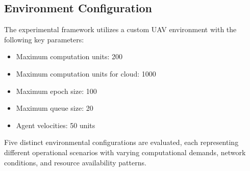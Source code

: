 \subsection{Environment Configuration}

The experimental framework utilizes a custom UAV environment with the following key parameters:
\begin{itemize}
\item Maximum computation units: 200
\item Maximum computation units for cloud: 1000
\item Maximum epoch size: 100
\item Maximum queue size: 20
\item Agent velocities: 50 units
\end{itemize}

Five distinct environmental configurations are evaluated, each representing different operational scenarios with varying computational demands, network conditions, and resource availability patterns.